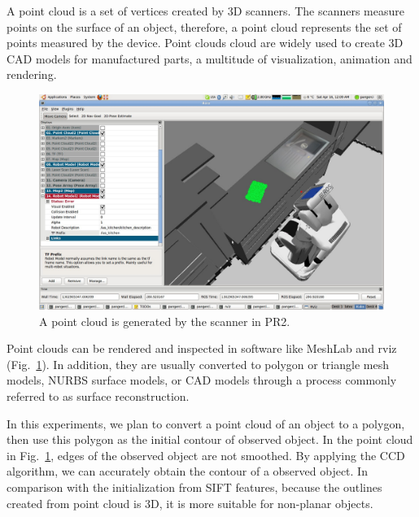 A point cloud is a set of vertices created by 3D
scanners. The scanners measure points on the surface of an object,
therefore, a point cloud represents the set of points measured by the
device. Point clouds cloud are widely used to  create 3D CAD models
for manufactured parts, a multitude of visualization, animation and
rendering.
\begin{figure}[htb]
  \centering
  \includegraphics[width=\linewidth]{images/pr2b.jpg}
  \caption[Point cloud of a book rendered in rivz]{A point cloud is
    generated by the scanner in PR2.}
  \label{fig:pointcloud}
\end{figure}

Point clouds can be rendered and inspected in software like MeshLab
and rviz (Fig.~\ref{fig:pointcloud}). In addition, they are usually converted to polygon or
triangle mesh models, NURBS surface models, or CAD models through a
process commonly referred to as surface reconstruction.

In this experiments, we plan to convert a point cloud of an object to a
polygon, then use this polygon as the initial contour of observed
object. In the point cloud in Fig.~\ref{fig:pointcloud}, edges of
the observed object are not smoothed. By applying the CCD algorithm,
we can accurately obtain the contour of a observed object. In
comparison with the initialization from SIFT features, because the
outlines created from point cloud is 3D, it is more
suitable for non-planar objects.
